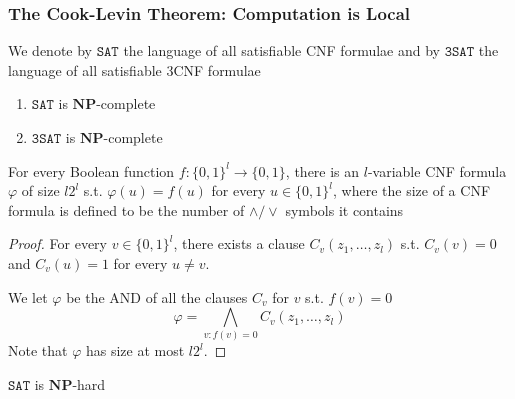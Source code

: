 \documentclass[11pt]{article}
\def \NP {\textbf{NP}}
\def \NP {\textbf{NP}}
\def \SAT {\texttt{SAT}}
\def \TSAT {\texttt{3SAT}}
\begin{document}
\subsubsection{The Cook-Levin Theorem: Computation is Local}
\label{sec:orga29e5bf}
We denote by \(\SAT\) the language of all satisfiable CNF formulae and by \(\TSAT\) the
language of all satisfiable 3CNF formulae

\begin{theorem}
\label{thm2.10}
\begin{enumerate}
\item \(\SAT\) is \(\NP\)-complete
\item \(\TSAT\) is \(\NP\)-complete
\end{enumerate}
\end{theorem}

\begin{lemma}
\label{lemma2.13}
For every Boolean function \(f:\{0,1\}^l\to\{0,1\}\), there is an \(l\)-variable CNF formula \(\varphi\)
of size \(l2^l\) s.t. \(\varphi(u)=f(u)\) for every \(u\in\{0,1\}^l\), where the size of a CNF
formula is defined to be the number of \(\wedge/\vee\) symbols it contains
\end{lemma}

\begin{proof}
For every \(v\in\{0,1\}^l\), there exists a clause \(C_v(z_1,\dots,z_l)\) s.t. \(C_v(v)=0\)
and \(C_v(u)=1\) for every \(u\neq v\).

We let \(\varphi\) be the AND of all the clauses \(C_v\) for \(v\) s.t. \(f(v)=0\)
     \begin{equation*}
\varphi=\bigwedge_{v:f(v)=0}C_v(z_1,\dots,z_l)
     \end{equation*}
Note that \(\varphi\) has size at most \(l2^l\).
\end{proof}

\begin{lemma}[]
\(\SAT\) is \(\NP\)-hard
\end{lemma}
\end{document}
